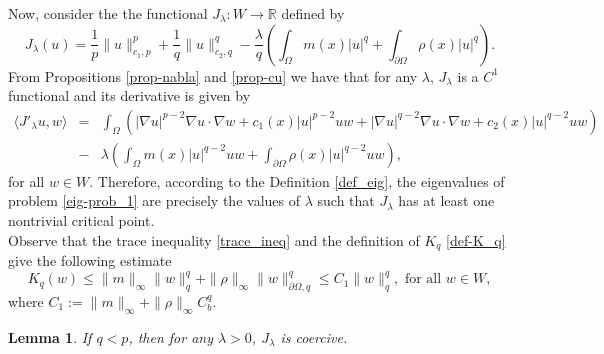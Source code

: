 \documentclass[pdflatex,sn-mathphys-num]{sn-jnl}
\theoremstyle{thmstyleone}%
\newtheorem{lem}[theorem]{Lemma}
\theoremstyle{thmstyletwo}%
\theoremstyle{thmstylethree}%
\theoremstyle{thmstylethree}%
\begin{document}
Now, consider the the functional $J_\lambda : W\to \mathbb{R}$ defined by
\begin{equation}\label{def_J_lamb}
    J_\lambda (u)=\frac{1}{p}\|u\|_{c_1,p}^p+\frac{1}{q}\|u\|_{c_2,q}^q-\frac{\lambda}{q}\left(\int_{\Omega} m(x) |u|^q+\int_{\partial\Omega} \rho(x)|u|^q\right).
\end{equation}
From Propositions \ref{prop-nabla} and \ref{prop-cu} we have that for any $\lambda$, $J_\lambda$ is a $C^1$ functional and its derivative is given by
\begin{eqnarray*}\label{deriv_J}
    \langle J'_{\lambda} u, w \rangle &=&\int_\Omega \left(|\nabla u|^{p-2}\nabla u \cdot \nabla w + c_1(x)|u|^{p-2}u w + |\nabla u|^{q-2}\nabla u \cdot \nabla w +c_2(x)|u|^{q-2}u w \right) \nonumber \\
    &-& \lambda \left(\int_{\Omega} m(x) |u|^{q-2}uw+\int_{\partial\Omega} \rho(x)|u|^{q-2}uw\right) ,
\end{eqnarray*}
for all $w\in W$.
Therefore, according to the Definition \ref{def_eig}, the eigenvalues of problem \eqref{eig-prob_1}
 are precisely the values of  $\lambda$ such that $J_\lambda$ has at least one nontrivial critical point. \\
Observe that the trace inequality \eqref{trace_ineq} and the definition of $K_q$ \eqref{def-K_q} give the following estimate 
    \begin{equation}\label{bound-K_q}
        K_q(w) \leqslant \|m\|_\infty \|w\|_q^q+ \|\rho \|_\infty \|w\|_{\partial\Omega, q}^q \leqslant C_1 \|w\|_q^q, \mbox{ for all } w\in W,
    \end{equation}
    where $C_1:=\|m\|_\infty+ \|\rho \|_\infty C_b^q$.  \begin{lem}\label{J_lambda-coer}
 If $q<p$, then
 for any $\lambda>0$, $J_\lambda$ is coercive.
\end{lem}
\end{document}
